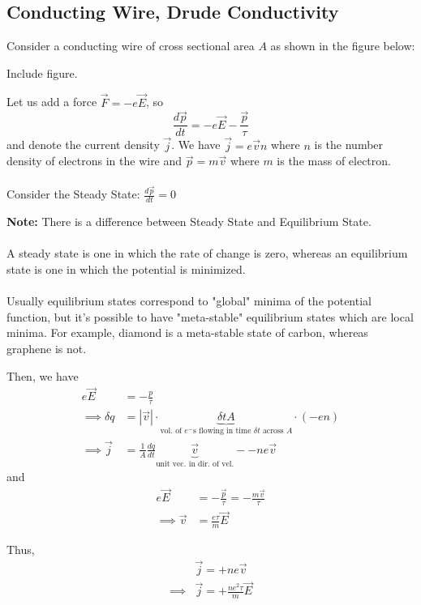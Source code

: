 \documentclass[11pt]{article}
\begin{document}
\subsection{Conducting Wire, Drude Conductivity}
Consider a conducting wire of cross sectional area $A$ as shown in the figure below:

\begin{center}
  Include figure.
\end{center}

Let us add a force $\vec{F} = -e\vec{E}$, so \[ \frac{d\vec{p}}{dt} = -e\vec{E} - \frac{\vec{p}}{\tau} \] and denote the current density $\vec{j}$. We have $\vec{j} = e\vec{v}n$ where $n$ is the number density of electrons in the wire and $\vec{p} = m\vec{v}$ where $m$ is the mass of electron.
\\
\\
Consider the Steady State: $\frac{d\vec{p}}{dt} = 0$ 

\begin{bluebox}
  \textbf{Note:} There is a difference between Steady State and Equilibrium State.
  \\
  \\
  A steady state is one in which the rate of change is zero, whereas an equilibrium state is one in which the potential is minimized.
  \\
  \\
  Usually equilibrium states correspond to "global" minima of the potential function, but it's possible to have "meta-stable" equilibrium states which are local minima. For example, diamond is a meta-stable state of carbon, whereas graphene is not.
\end{bluebox}

Then, we have 
\begin{align*}
  e\vec{E} &= - \frac{p}{\tau} \\
  \implies \delta q &= |\vec{v}| \cdot \underbrace{\delta t A}_{\text{vol. of $e^-$s flowing in time $\delta t$ across $A$}}\cdot (-en) \\
  \implies \vec{j} &= \frac{1}{A} \frac{dq}{dt} \underbrace{\vec{v}}_{\text{unit vec. in dir. of vel.}} - -ne \vec{v}
\end{align*} 
and
\begin{align*}
  e\vec{E} &= -\frac{\vec{p}}{\tau} = -\frac{m\vec{v}}{\tau} \\
  \implies \vec{v} &= \frac{e \tau}{m} \vec{E}
\end{align*}

Thus,
\begin{align*}
  &\vec{j} = +ne\vec{v} \\
  \implies& \vec{j} = +\frac{ne^2 \tau}{m} \vec{E}
\end{align*}
\end{document}
